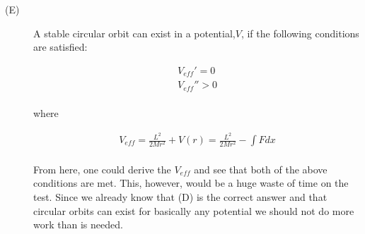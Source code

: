 \documentclass[12pt]{article}
\begin{document}
{\begin{description}
\item[(E)] A stable circular orbit can exist in a potential,$V$, if the following conditions are satisfied:

\begin{gather}
V_{eff}' = 0\\
V_{eff}'' > 0
\end{gather}
\\
where

\begin{gather}
V_{eff} = \frac{L^{2}}{2Mr^{2}} + V(r) = \frac{L^{2}}{2Mr^{2}} - \int{F}dx
\end{gather}
\\
From here, one could derive the $V_{eff}$ and see that both of the above conditions are met. This, however, would be a huge waste of time on the test. Since we already know that (D) is the correct answer and that circular orbits can exist for basically any potential we should not do more work than is needed.
\\
\end{description}
}



\end{document}
